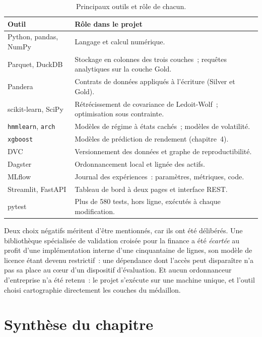 \begin{table}[htbp]
  \centering
  \small
  \caption[Pile technique]{Principaux outils et rôle de chacun.}
  \label{tab:pile}
  \begin{tabular}{@{}p{3.3cm}p{9.2cm}@{}}
    \toprule
    \textbf{Outil} & \textbf{Rôle dans le projet} \\
    \midrule
    Python, pandas, NumPy & Langage et calcul numérique. \\
    Parquet, DuckDB & Stockage en colonnes des trois couches~; requêtes
    analytiques sur la couche Gold. \\
    Pandera & Contrats de données appliqués à l'écriture (Silver et Gold). \\
    scikit-learn, SciPy & Rétrécissement de covariance de Ledoit-Wolf~;
    optimisation sous contrainte. \\
    \texttt{hmmlearn}, \texttt{arch} & Modèles de régime à états cachés~;
    modèles de volatilité. \\
    \texttt{xgboost} & Modèles de prédiction de rendement (chapitre~4). \\
    DVC & Versionnement des données et graphe de reproductibilité. \\
    Dagster & Ordonnancement local et lignée des actifs. \\
    MLflow & Journal des expériences~: paramètres, métriques, code. \\
    Streamlit, FastAPI & Tableau de bord à deux pages et interface REST. \\
    pytest & Plus de 580 tests, hors ligne, exécutés à chaque modification. \\
    \bottomrule
  \end{tabular}
\end{table}

Deux choix négatifs méritent d'être mentionnés, car ils ont été délibérés. Une
bibliothèque spécialisée de validation croisée pour la finance a été
\emph{écartée} au profit d'une implémentation interne d'une cinquantaine de
lignes, son modèle de licence étant devenu restrictif~: une dépendance dont
l'accès peut disparaître n'a pas sa place au cœur d'un dispositif d'évaluation.
Et aucun ordonnanceur d'entreprise n'a été retenu~: le projet s'exécute sur une
machine unique, et l'outil choisi cartographie directement les couches du
médaillon.

\section*{Synthèse du chapitre}

